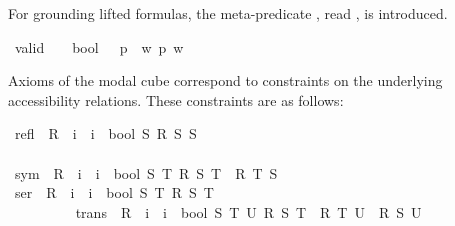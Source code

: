 \begin{isabellebody}
\begin{isamarkuptext}%
For grounding lifted formulas, the meta-predicate \isa{{\isacharbrackleft}{\isasymcdot}{\isacharbrackright}}, read , is introduced.%
\end{isamarkuptext}%
\isamarkuptrue%
\isamarkupfalse%
\ valid\ {\isacharcolon}{\isacharcolon}\ {\isachardoublequoteopen}{\isasymsigma}\ {\isasymRightarrow}\ bool{\isachardoublequoteclose}\ \ \ {\isachardoublequoteopen}{\isacharbrackleft}p{\isacharbrackright}\ {\isasymequiv}\ {\isasymforall}w{\isachardot}\ p\ w{\isachardoublequoteclose}%
\isamarkuptrue%
%
\isamarkuptrue%
%
\begin{isamarkuptext}%
Axioms of the modal cube correspond to constraints on the underlying accessibility relations.
These constraints are as follows:%
\end{isamarkuptext}%
\isamarkuptrue%
\isanewline
{}\isamarkupfalse%
\ {\isachardoublequoteopen}refl\ {\isasymequiv}\ {\isasymlambda}R\ {\isacharcolon}{\isacharcolon}\ {\isacharparenleft}i\ {\isasymRightarrow}\ i\ {\isasymRightarrow}\ bool{\isacharparenright}{\isachardot}\ {\isasymforall}S{\isachardot}\ R\ S\ S{\isachardoublequoteclose}\ \ \ \ \ \ \ \ \ \ \ \ \ \ \ \ \ \ \ \ \ \ \ \ \ \ \ \ \ \ \ \ \ \ \ \ \ \ \ \ \ \ \ \ \ \ \ \ \ \ \ \ \ \ \ \ \ %
\isanewline
{}\isamarkupfalse%
\ {\isachardoublequoteopen}sym\ {\isasymequiv}\ {\isasymlambda}R\ {\isacharcolon}{\isacharcolon}\ {\isacharparenleft}i\ {\isasymRightarrow}\ i\ {\isasymRightarrow}\ bool{\isacharparenright}{\isachardot}\ {\isasymforall}S\ T{\isachardot}\ {\isacharparenleft}R\ S\ T\ {\isasymlongrightarrow}\ R\ T\ S{\isacharparenright}{\isachardoublequoteclose}\ \ \ \ \ \ \ \ \ \ \ \ \ \ \ \ \ \ \ \ \ \ \ \ \ \ \ \ \ \ \ \ %
\isanewline
{}\isamarkupfalse%
\ {\isachardoublequoteopen}ser\ {\isasymequiv}\ {\isasymlambda}R\ {\isacharcolon}{\isacharcolon}\ {\isacharparenleft}i\ {\isasymRightarrow}\ i\ {\isasymRightarrow}\ bool{\isacharparenright}{\isachardot}\ {\isasymforall}S{\isachardot}\ {\isasymexists}T{\isachardot}\ R\ S\ T{\isachardoublequoteclose}\ \ \ \ \ \ \ \ \ \ \ \ \ \ \ \ \ \ \ \ \ \ \ \ \ \ \ \ \ \ \ \ \ \ \ \ \ \ \ \ \ \ \ \ \ \ \ \ \ \ %
\isanewline
{}\isamarkupfalse%
\ {\isachardoublequoteopen}trans\ {\isasymequiv}\ {\isasymlambda}R\ {\isacharcolon}{\isacharcolon}\ {\isacharparenleft}i\ {\isasymRightarrow}\ i\ {\isasymRightarrow}\ bool{\isacharparenright}{\isachardot}\ {\isasymforall}S\ T\ U{\isachardot}\ {\isacharparenleft}R\ S\ T\ {\isasymand}\ R\ T\ U\ {\isasymlongrightarrow}\ R\ S\ U{\isacharparenright}{\isachardoublequoteclose}\ \ \ \ \ \ \ \ \ \ \ %

\end{isabellebody}
